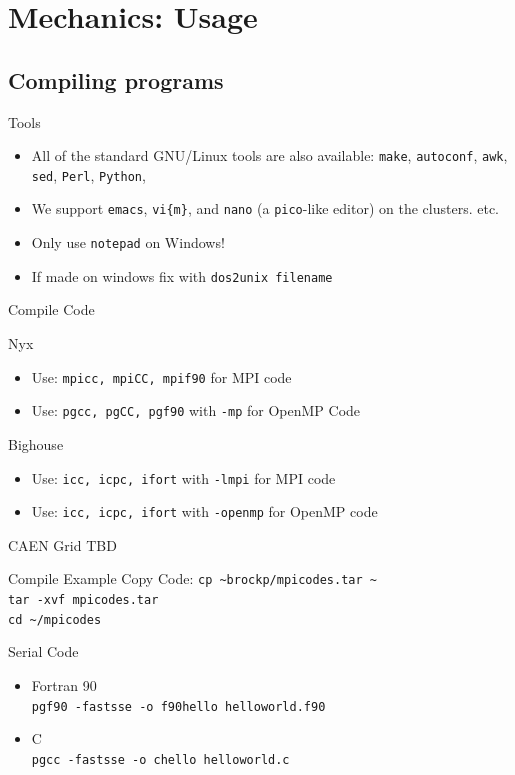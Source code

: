 \documentclass{beamer}
\begin{document}
  \section{Mechanics: Usage}
  \subsection{Compiling programs}
  \begin{frame}{Tools}
    \begin{itemize}
    \item<1- > All of the standard GNU/Linux tools are also available: \texttt{make},
      \texttt{autoconf}, \texttt{awk}, \texttt{sed}, \texttt{Perl}, \texttt{Python},
    \item<2- > We support \texttt{emacs}, \texttt{vi\{m\}}, and \texttt{nano} (a 
      \texttt{pico}-like editor) on the clusters.
      etc.
    \item<3-| alert@1-> Only use \texttt{notepad} on Windows!
    \item<3-| alert@1-> If made on windows fix with \texttt{dos2unix filename}
    \end{itemize}
  \end{frame}
  \begin{frame}{Compile Code}
   \begin{block}{Nyx}
   \begin{itemize}
    \item Use: \texttt{mpicc, mpiCC, mpif90} for MPI code
    \item Use: \texttt{pgcc, pgCC, pgf90} with \texttt{-mp} for OpenMP Code
   \end{itemize}
   \end{block}
   \begin{block}{Bighouse}
    \begin{itemize}
     \item Use: \texttt{icc, icpc, ifort} with \texttt{-lmpi} for MPI code
     \item Use: \texttt{icc, icpc, ifort} with \texttt{-openmp} for OpenMP code
    \end{itemize}
   \end{block}
   \begin{block}{CAEN Grid}
    TBD
   \end{block}
  \end{frame}
\begin{frame}{Compile Example}
 Copy Code: \texttt{cp \~{}brockp/mpicodes.tar \~{}} 
 \\ \texttt{tar -xvf mpicodes.tar}  \\ \texttt{cd \~{}/mpicodes}
 \begin{block}{Serial Code}
  \begin{itemize}
   \item Fortran 90
         \\ \texttt{pgf90 -fastsse -o f90hello helloworld.f90}
   \item C
         \\ \texttt{pgcc -fastsse -o chello helloworld.c}
  \end{itemize}
 \end{block}
\end{frame}
\end{document}
